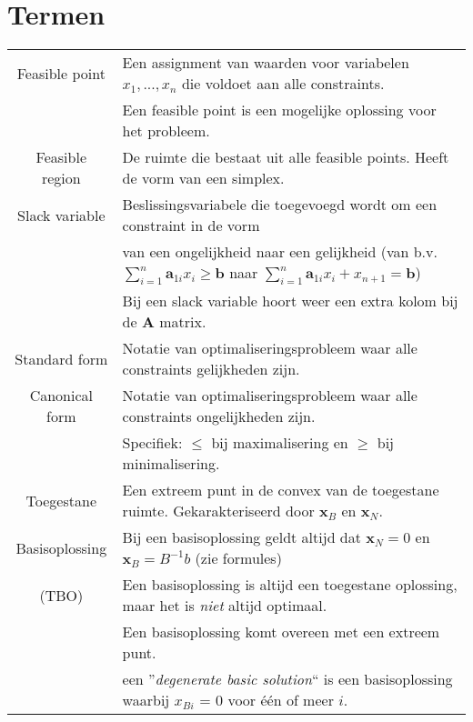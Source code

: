 \documentclass[10pt,a4paper]{article}
\begin{document}
\section*{Termen}
\begin{tabular}{|c|l|}
\hline
Feasible point & Een assignment van waarden voor variabelen $x_1, ..., x_n$ die voldoet aan alle constraints. \\ 
& Een feasible point is een mogelijke oplossing voor het probleem.\\
\hline
Feasible region & De ruimte die bestaat uit alle feasible points. Heeft de vorm van een simplex. \\
\hline
Slack variable & Beslissingsvariabele die toegevoegd wordt om een constraint in de vorm \\ &van een ongelijkheid naar een gelijkheid (van b.v. $\displaystyle\sum\limits_{i = 1}^n \textbf{a}_{1i}x_i \geq \textbf{b}$ naar $\displaystyle\sum\limits_{i = 1}^n \textbf{a}_{1i}x_i + x_{n + 1} = \textbf{b}$) \\
& Bij een slack variable hoort weer een extra kolom bij de $\textbf{A}$ matrix. \\
\hline
Standard form & Notatie van optimaliseringsprobleem waar alle constraints gelijkheden zijn.\\
\hline
Canonical form & Notatie van optimaliseringsprobleem waar alle constraints ongelijkheden zijn.\\
 & Specifiek: $\le$ bij maximalisering en $\geq$ bij minimalisering. \\
\hline
Toegestane & Een extreem punt in de convex van de toegestane ruimte. Gekarakteriseerd door $\textbf{x}_B$ en $\textbf{x}_N$. \\
Basisoplossing & Bij een basisoplossing geldt altijd dat $\textbf{x}_N = 0$ en $\textbf{x}_B = B^{-1}b$ (zie formules) \\
(TBO) & Een basisoplossing is altijd een toegestane oplossing, maar het is \textit{niet} altijd optimaal. \\
 & Een basisoplossing komt overeen met een extreem punt. \\
 & een ''\textit{degenerate basic solution}`` is een basisoplossing waarbij $x_{Bi}$ = 0 voor één of meer $i$. \\
\hline
\end{tabular} 
\end{document}
